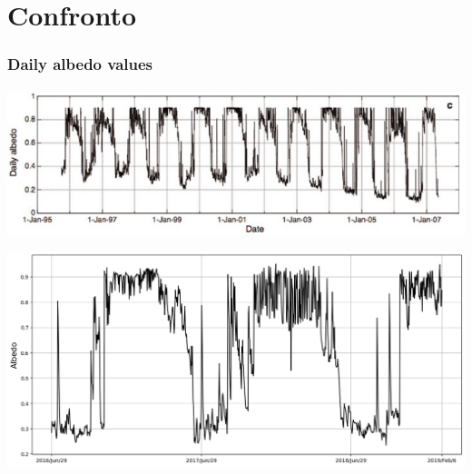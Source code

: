\section{Confronto}


\begin{frame}
    \frametitle{Daily albedo values}
    \framesubtitle{}

    \center
    \begin{minipage}{0.5\textwidth}
        \includegraphics[width=\textwidth]{Immagini/albedoOerlemans.png}
    \end{minipage}
    \begin{minipage}{0.5\textwidth}
        \includegraphics[width=\textwidth]{Immagini/albedoYear.png}
    \end{minipage}

\end{frame}



